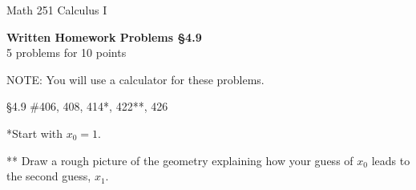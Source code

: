 \documentclass[11pt]{report}
\theoremstyle{plain}
\begin{document}
\hfill Math 251 Calculus I
\begin{center}
\Large{\textbf{Written Homework Problems \S 4.9}} \\
5 problems for 10 points\\
\end{center}

NOTE: You will use a calculator for these problems. 

\begin{description}
\item{\S 4.9} \#406, 408, 414*, 422**, 426 \\
\end{description}

*Start with $x_0=1.$

** Draw a rough picture of the geometry explaining how your guess of $x_0$ leads to the second guess, $x_1.$
\end{document}
